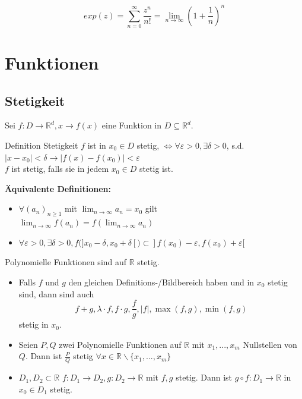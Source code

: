 \documentclass[a4paper,fontsize = 7pt]{scrartcl}
\def\limn{\lim_{n\to \infty}}
\def\R{\mathbb{R}}
\begin{document}
\begin{subbox}{}
  \vspace{-8pt}
  $$exp(z) = \sum_{n = 0}^{\infty} \frac{z^n}{n!} = \limn (1 + \frac{1}{n})^n$$
  \vspace{-12pt}
\end{subbox}

\section{Funktionen}
\subsection{Stetigkeit}
Sei $f : D \to \R^d, x \to f(x)$ eine Funktion in $D \subseteq \R^d$.
\begin{mainbox}{Definition Stetigkeit}
  \vspace{-4pt}
 $f$ ist in $x_0 \in D$ stetig, $\iff \forall \varepsilon > 0, \exists \delta > 0$, s.d. $|x-x_0|<\delta \to |f(x)-f(x_0)| < \varepsilon$
 \\$f$ ist stetig, falls sie in jedem $x_0 \in D$ stetig ist. 
 \vspace{-4pt}
\end{mainbox}
\textbf{Äquivalente Definitionen:} 
\begin{itemize}
 \item $\forall(a_n)_{n \geq 1}$ mit $\limn a_n = x_0$ gilt \\ $\limn f(a_n) = f(\limn a_n)$
 \item $\forall \varepsilon > 0, \exists \delta >0, f(]x_0 - \delta, x_0 + \delta[) \subset  ]f(x_0) - \varepsilon, f(x_0) + \varepsilon[$
\end{itemize}
Polynomielle Funktionen sind auf $\R$ stetig.
\begin{subbox}{}
  \vspace{-8pt}
  \begin{itemize}
    \item Falls $f$ und $g$ den gleichen Definitions-/Bildbereich haben und in $x_0$ stetig sind, dann sind auch $$f + g, \lambda \cdot f, f \cdot g, \frac{f}{g}, |f|, \max(f,g), \min(f,g)$$ stetig in $x_0$.
    \item Seien $P,Q$ zwei Polynomielle Funktionen auf $\R$ mit $x_1, ..., x_m$ Nullstellen von $Q$. Dann ist $\frac{P}{Q}$ stetig $\forall x \in \R \backslash \{x_1, ..., x_m\}$
    \item $D_1, D_2 \subset \R$ $f: D_1 \to D_2, g: D_2 \to \R$ mit $f, g$ stetig. Dann ist $g \circ f: D_1 \to \R$ in $x_0 \in D_1$ stetig.   
  \end{itemize}
  \vspace{-12pt}
\end{subbox}
\end{document}
